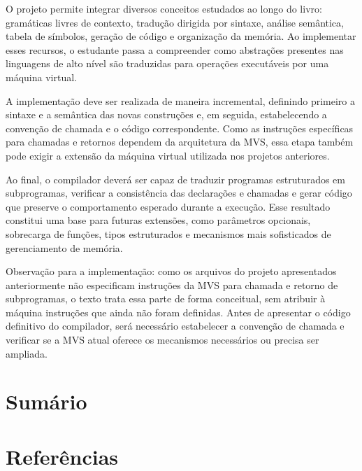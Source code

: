 \documentclass[
  brazilian,
  letterpaper,
]{book}
\theoremstyle{plain}
\theoremstyle{definition}
\theoremstyle{remark}
\begin{document}
O projeto permite integrar diversos conceitos estudados ao longo do
livro: gramáticas livres de contexto, tradução dirigida por sintaxe,
análise semântica, tabela de símbolos, geração de código e organização
da memória. Ao implementar esses recursos, o estudante passa a
compreender como abstrações presentes nas linguagens de alto nível são
traduzidas para operações executáveis por uma máquina virtual.

A implementação deve ser realizada de maneira incremental, definindo
primeiro a sintaxe e a semântica das novas construções e, em seguida,
estabelecendo a convenção de chamada e o código correspondente. Como as
instruções específicas para chamadas e retornos dependem da arquitetura
da MVS, essa etapa também pode exigir a extensão da máquina virtual
utilizada nos projetos anteriores.

Ao final, o compilador deverá ser capaz de traduzir programas
estruturados em subprogramas, verificar a consistência das declarações e
chamadas e gerar código que preserve o comportamento esperado durante a
execução. Esse resultado constitui uma base para futuras extensões, como
parâmetros opcionais, sobrecarga de funções, tipos estruturados e
mecanismos mais sofisticados de gerenciamento de memória.

Observação para a implementação: como os arquivos do projeto
apresentados anteriormente não especificam instruções da MVS para
chamada e retorno de subprogramas, o texto trata essa parte de forma
conceitual, sem atribuir à máquina instruções que ainda não foram
definidas. Antes de apresentar o código definitivo do compilador, será
necessário estabelecer a convenção de chamada e verificar se a MVS atual
oferece os mecanismos necessários ou precisa ser ampliada.


\chapter{Sumário}\label{sumuxe1rio}


\chapter*{Referências}\label{referuxeancias}

\end{document}
